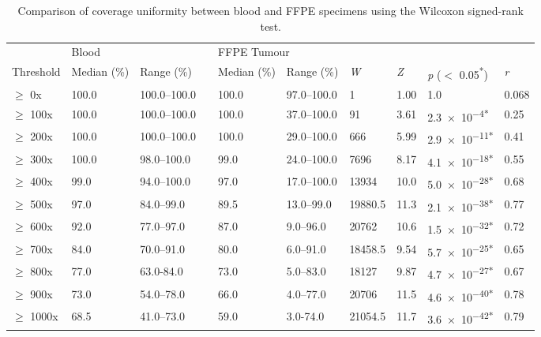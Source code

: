 \begin{table}[H]
\caption{Comparison of coverage uniformity between blood and FFPE specimens using the Wilcoxon signed-rank test.}
\label{tbl:metrics}
\centering
      \begin{tabular}{llllllllll}
        \hline
				\multicolumn{1}{l}{ }
				&
				\multicolumn{2}{l}{Blood}
				&&
				\multicolumn{2}{l}{FFPE Tumour}
				&
				\multicolumn{4}{l}{ } \\
				\cline{2-3}\cline{5-6}
        Threshold & Median (\%) & Range (\%) && Median (\%) & Range (\%) & \textit{W} & \textit{Z} & \textit{p} ($<$ 0.05\textsuperscript{*}) & \textit{r}
				\\
				\hline
				$\geq$ 0x & 100.0 & 100.0--100.0 && 100.0 & 97.0--100.0 & 1 & 1.00 & 1.0 & 0.068
				\\
				$\geq$ 100x & 100.0 & 100.0--100.0 && 100.0 & 37.0--100.0 & 91 & 3.61 & \num{2.3e-4}\textsuperscript{*} & 0.25
				\\
				$\geq$ 200x & 100.0 & 100.0--100.0 && 100.0 & 29.0--100.0 & 666 & 5.99 & \num{2.9e-11}\textsuperscript{*} & 0.41
				\\
				$\geq$ 300x & 100.0 & 98.0--100.0 && 99.0 & 24.0--100.0 & 7696 & 8.17 & \num{4.1e-18}\textsuperscript{*} & 0.55
				\\
				$\geq$ 400x & 99.0 & 94.0--100.0 && 97.0 & 17.0--100.0 & 13934 & 10.0 & \num{5.0e-28}\textsuperscript{*} & 0.68
				\\
				$\geq$ 500x & 97.0 & 84.0--99.0 && 89.5 & 13.0--99.0 & 19880.5 & 11.3 & \num{2.1e-38}\textsuperscript{*} & 0.77
				\\
				$\geq$ 600x & 92.0 & 77.0--97.0 && 87.0 & 9.0--96.0 & 20762 & 10.6 & \num{1.5e-32}\textsuperscript{*} & 0.72
				\\
				$\geq$ 700x & 84.0 & 70.0--91.0 && 80.0 & 6.0--91.0 & 18458.5 & 9.54 & \num{5.7e-25}\textsuperscript{*} & 0.65
				\\
				$\geq$ 800x & 77.0 & 63.0-84.0 && 73.0 & 5.0--83.0 & 18127 & 9.87 & \num{4.7e-27}\textsuperscript{*} & 0.67
				\\
				$\geq$ 900x & 73.0 & 54.0--78.0 && 66.0 & 4.0--77.0 & 20706 & 11.5 & \num{4.6e-40}\textsuperscript{*} & 0.78
				\\
				$\geq$ 1000x & 68.5 & 41.0--73.0 && 59.0 & 3.0-74.0 & 21054.5 & 11.7 & \num{3.6e-42}\textsuperscript{*} & 0.79
				\\
				\hline
      \end{tabular} \\
\end{table}

